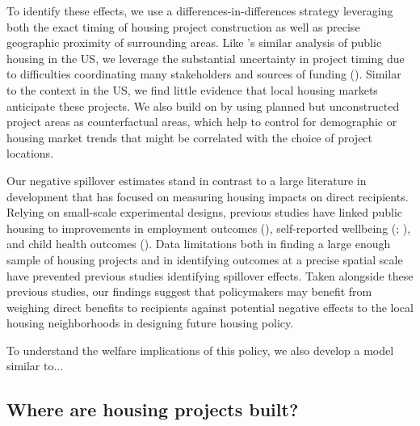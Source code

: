 \documentclass[12pt]{article}
\begin{document}
To identify these effects, we use a differences-in-differences strategy leveraging both the exact timing of housing project construction as well as precise geographic proximity of surrounding areas.  Like \cite{diamond2016wants}'s similar analysis of public housing in the US, we leverage the substantial uncertainty in project timing due to difficulties coordinating many stakeholders and sources of funding (\cite{serihistory}).  Similar to the context in the US, we find little evidence that local housing markets anticipate these projects.  We also build on \cite{diamond2016wants} by using planned but unconstructed project areas as counterfactual areas, which help to control for demographic or housing market trends that might be correlated with the choice of project locations.

Our negative spillover estimates stand in contrast to a large literature in development that has focused on measuring housing impacts on direct recipients.  Relying on small-scale experimental designs, previous studies have linked public housing to improvements in employment outcomes (\cite{franklin2016enabled}), self-reported wellbeing (\cite{galiani2017shelter}; \cite{devoto2012happiness}), and child health outcomes (\cite{cattaneo2009housing}).  Data limitations both in finding a large enough sample of housing projects and in identifying outcomes at a precise spatial scale have prevented previous studies identifying spillover effects.  Taken alongside these previous studies, our findings suggest that policymakers may benefit from weighing direct benefits to recipients against potential negative effects to the local housing neighborhoods in designing future housing policy.

To understand the welfare implications of this policy, we also develop a model similar to... 



\subsection{Where are housing projects built?}
\end{document}
